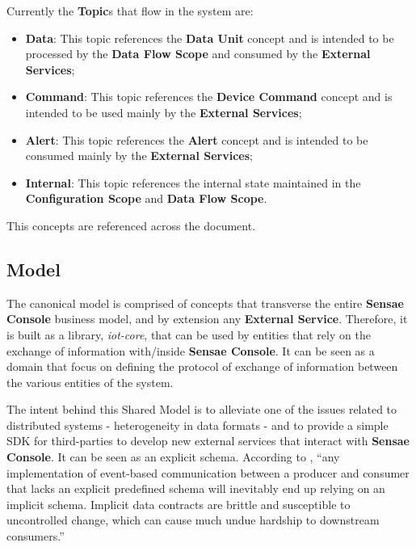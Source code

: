 Currently the \textbf{Topic}s that flow in the system are:

\begin{itemize}
   \item \textbf{Data}: This topic references the \textbf{Data Unit} concept and is intended to be processed by the \textbf{Data Flow Scope} and consumed by the \textbf{External Services};
   \item \textbf{Command}: This topic references the \textbf{Device Command} concept and is intended to be used mainly by the \textbf{External Services};
   \item \textbf{Alert}: This topic references the \textbf{Alert} concept and is intended to be consumed mainly by the \textbf{External Services};
   \item \textbf{Internal}: This topic references the internal state maintained in the \textbf{Configuration Scope} and \textbf{Data Flow Scope}.
\end{itemize}

This concepts are referenced across the document.

\subsection{Model}
\label{subsec:design:domain:shared_model}

The canonical model is comprised of concepts that transverse the entire \textbf{Sensae Console} business model, and by extension any \textbf{External Service}. Therefore, it is built as a library, \textit{iot-core}, that can be used by entities that rely on the exchange of information with/inside \textbf{Sensae Console}. It can be seen as a domain that focus on defining the protocol of exchange of information between the various entities of the system.

The intent behind this Shared Model is to alleviate one of the issues related to distributed systems - heterogeneity in data formats \parencite{nadiminti2006distributed} - and to provide a simple \gls{SDK} for third-parties to develop new external services that interact with \textbf{Sensae Console}. It can be seen as an explicit schema. According to \cite{explicitsharedmodel}, ``any implementation of event-based communication between a producer and consumer that lacks an explicit predefined schema will inevitably end up relying on an implicit schema. Implicit data contracts are brittle and susceptible to uncontrolled change, which can cause much undue hardship to downstream consumers.''

